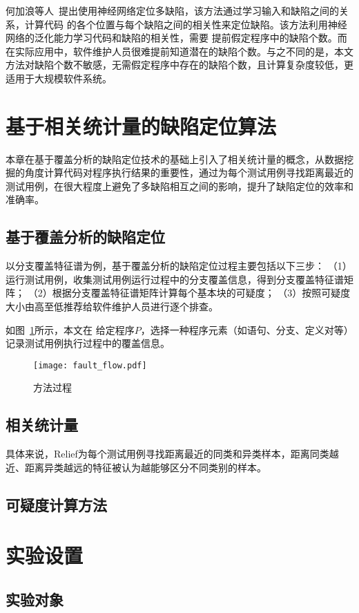 何加浪等人~\cite{neural2013}提出使用神经网络定位多缺陷，该方法通过学习输入和缺陷之间的关系，计算代码
的各个位置与每个缺陷之间的相关性来定位缺陷。该方法利用神经网络的泛化能力学习代码和缺陷的相关性，需要
提前假定程序中的缺陷个数。而在实际应用中，软件维护人员很难提前知道潜在的缺陷个数。与之不同的是，本文
方法对缺陷个数不敏感，无需假定程序中存在的缺陷个数，且计算复杂度较低，更适用于大规模软件系统。

\section{基于相关统计量的缺陷定位算法}
本章在基于覆盖分析的缺陷定位技术的基础上引入了相关统计量的概念，从数据挖掘的角度计算代码对程序执行结果的重要性，通过为每个测试用例寻找距离最近的测试用例，在很大程度上避免了多缺陷相互之间的影响，提升了缺陷定位的效率和准确率。

\subsection{基于覆盖分析的缺陷定位}
以分支覆盖特征谱为例，基于覆盖分析的缺陷定位过程主要包括以下三步：
（1）运行测试用例，收集测试用例运行过程中的分支覆盖信息，得到分支覆盖特征谱矩阵；
（2）根据分支覆盖特征谱矩阵计算每个基本块的可疑度；
（3）按照可疑度大小由高至低推荐给软件维护人员进行逐个排查。

如图~\ref{fig:fault_flow}所示，本文在
给定程序$P$，选择一种程序元素（如语句、分支、定义对等）记录测试用例执行过程中的覆盖信息。
\begin{figure}[htp]
      \centering
      \texttt{[image: fault\_flow.pdf]}
      \caption{方法过程}
      \label{fig:fault_flow}
\end{figure}

\subsection{相关统计量}
具体来说，Relief为每个测试用例寻找距离最近的同类和异类样本，距离同类越近、距离异类越远的特征被认为越能够区分不同类别的样本。
\subsection{可疑度计算方法}
\section{实验设置}
\subsection{实验对象}
